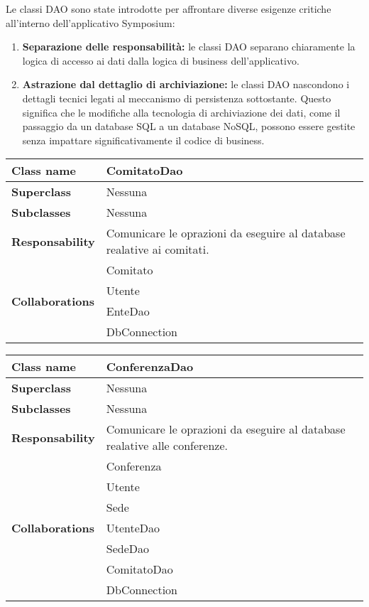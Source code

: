Le classi DAO sono state introdotte per affrontare diverse esigenze critiche all'interno dell'applicativo Symposium:
\begin{enumerate}
	\item \textbf{Separazione delle responsabilità:} le classi DAO separano chiaramente la logica di accesso ai dati dalla logica di business dell'applicativo. 
	\item \textbf{Astrazione dal dettaglio di archiviazione:} le classi DAO nascondono i dettagli tecnici legati al meccanismo di persistenza sottostante. Questo significa che le modifiche alla tecnologia di archiviazione dei dati, come il passaggio da un database SQL a un database NoSQL, possono essere gestite senza impattare significativamente il codice di business.
\end{enumerate}
\newpage
\begin{table}[h!]
	\begin{tabular}{|l|l|}
		\hline 
		\textbf{Class name} & ComitatoDao
		\\ \hline
		\textbf{Superclass} & Nessuna
		\\ \hline
		\multirow{1}{*}{\textbf{Subclasses}} & Nessuna
		\\ \hline
		\textbf{Responsability} & Comunicare le oprazioni da eseguire al database realative ai comitati.
		\\ \hline
		\multirow{4}{*}{\textbf{Collaborations}} & Comitato \\ 
		& Utente \\
		& EnteDao \\
		& DbConnection \\
	\hline
	\end{tabular}
\end{table}

\begin{table}[h!]
	\begin{tabular}{|l|l|}
		\hline 
		\textbf{Class name} & ConferenzaDao
		\\ \hline
		\textbf{Superclass} & Nessuna
		\\ \hline
		\multirow{1}{*}{\textbf{Subclasses}} & Nessuna
		\\ \hline
		\textbf{Responsability} & Comunicare le oprazioni da eseguire al database realative alle conferenze.
		\\ \hline
		\multirow{7}{*}{\textbf{Collaborations}} & Conferenza \\ 
		& Utente \\
		& Sede \\
		& UtenteDao\\
		& SedeDao \\
		& ComitatoDao \\
		& DbConnection \\ \hline
	\end{tabular}
\end{table}


